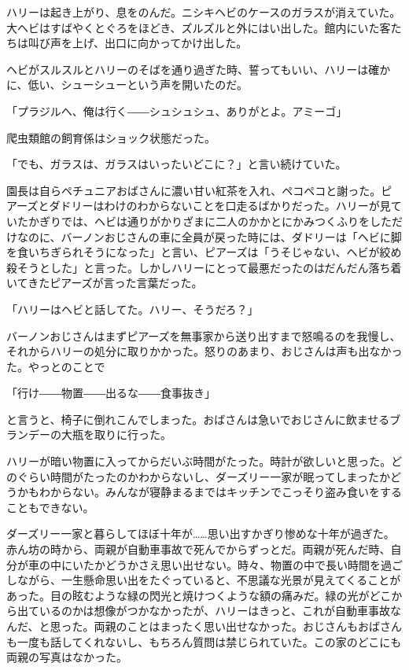 \documentclass[10pt,a4paper]{article}
\begin{document}
\begin{CJK}{UTF8}{min}
ハリーは起き上がり、息をのんだ。ニシキヘビのケースのガラスが消えていた。大ヘビはすばやくとぐろをほどき、ズルズルと外にはい出した。館内にいた客たちは叫び声を上げ、出口に向かってかけ出した。

ヘビがスルスルとハリーのそばを通り過ぎた時、誓ってもいい、ハリーは確かに、低い、シューシューという声を開いたのだ。

「プラジルへ、俺は行く――シュシュシュ、ありがとよ。アミーゴ」

爬虫類館の飼育係はショック状態だった。

「でも、ガラスは、ガラスはいったいどこに？」と言い続けていた。

園長は自らペチュニアおばさんに濃い甘い紅茶を入れ、ペコペコと謝った。ピアーズとダドリーはわけのわからないことを口走るばかりだった。ハリーが見ていたかぎりでは、ヘビは通りがかりざまに二人のかかとにかみつくふりをしただけなのに、バーノンおじさんの車に全員が戻った時には、ダドリーは「ヘビに脚を食いちぎられそうになった」と言い、ピアーズは「うそじゃない、ヘビが絞め殺そうとした」と言った。しかしハリーにとって最悪だったのはだんだん落ち着いてきたピアーズが言った言葉だった。

「ハリーはヘビと話してた。ハリー、そうだろ？」

バーノンおじさんはまずピアーズを無事家から送り出すまで怒鳴るのを我慢し、それからハリーの処分に取りかかった。怒りのあまり、おじさんは声も出なかった。やっとのことで

「行け――物置――出るな――食事抜き」

と言うと、椅子に倒れこんでしまった。おばさんは急いでおじさんに飲ませるブランデーの大瓶を取りに行った。



ハリーが暗い物置に入ってからだいぶ時間がたった。時計が欲しいと思った。どのぐらい時間がたったのかわからないし、ダーズリー一家が眠ってしまったかどうかもわからない。みんなが寝静まるまではキッチンでこっそり盗み食いをすることもできない。

ダーズリー一家と暮らしてほぼ十年が……思い出すかぎり惨めな十年が過ぎた。赤ん坊の時から、両親が自動車事故で死んでからずっとだ。両親が死んだ時、自分が車の中にいたかどうかさえ思い出せない。時々、物置の中で長い時間を過ごしながら、一生懸命思い出をたぐっていると、不思議な光景が見えてくることがあった。目の眩むような緑の閃光と焼けつくような額の痛みだ。緑の光がどこから出ているのかは想像がつかなかったが、ハリーはきっと、これが自動車事故なんだ、と思った。両親のことはまったく思い出せなかった。おじさんもおばさんも一度も話してくれないし、もちろん質問は禁じられていた。この家のどこにも両親の写真はなかった。


\end{CJK}
\end{document}
